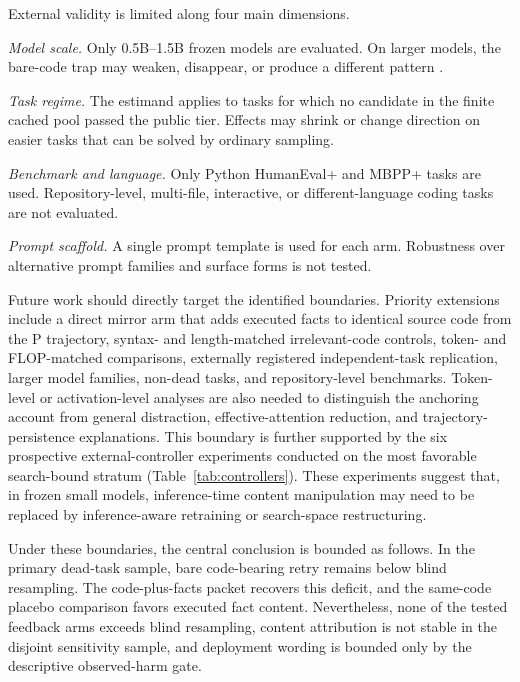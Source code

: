 \documentclass{article}
\numberwithin{equation}{section}  %
\theoremstyle{definition}
\newcommand{\armP}{\textsf{P}}
\begin{document}
External validity is limited along four main dimensions.

\emph{Model scale.}
Only 0.5B--1.5B frozen models are evaluated. On larger models, the bare-code trap may weaken,
disappear, or produce a different pattern
\citep{olausson2024selfrepair,dinh2023bugs,lam2025codecrash}.

\emph{Task regime.}
The estimand applies to tasks for which no candidate in the finite cached pool passed the
public tier. Effects may shrink or change direction on easier tasks that can be solved by
ordinary sampling.

\emph{Benchmark and language.}
Only Python HumanEval+ and MBPP+ tasks are used. Repository-level, multi-file, interactive,
or different-language coding tasks are not evaluated.

\emph{Prompt scaffold.}
A single prompt template is used for each arm. Robustness over alternative prompt families
and surface forms is not tested.

Future work should directly target the identified boundaries. Priority extensions include a
direct mirror arm that adds executed facts to identical source code from the \armP{}
trajectory, syntax- and length-matched irrelevant-code controls, token- and FLOP-matched
comparisons, externally registered independent-task replication, larger model families,
non-dead tasks, and repository-level benchmarks. Token-level or activation-level analyses are
also needed to distinguish the anchoring account from general distraction, effective-attention
reduction, and trajectory-persistence explanations. This boundary is further supported by the
six prospective external-controller experiments conducted on the most favorable search-bound
stratum (Table~\ref{tab:controllers}). These experiments suggest that, in frozen small
models, inference-time content manipulation may need to be replaced by inference-aware
retraining or search-space restructuring.

Under these boundaries, the central conclusion is bounded as follows. In the primary dead-task
sample, bare code-bearing retry remains below blind resampling. The code-plus-facts packet
recovers this deficit, and the same-code placebo comparison favors executed fact content.
Nevertheless, none of the tested feedback arms exceeds blind resampling, content attribution
is not stable in the disjoint sensitivity sample, and deployment wording is bounded only by
the descriptive observed-harm gate.
\end{document}
